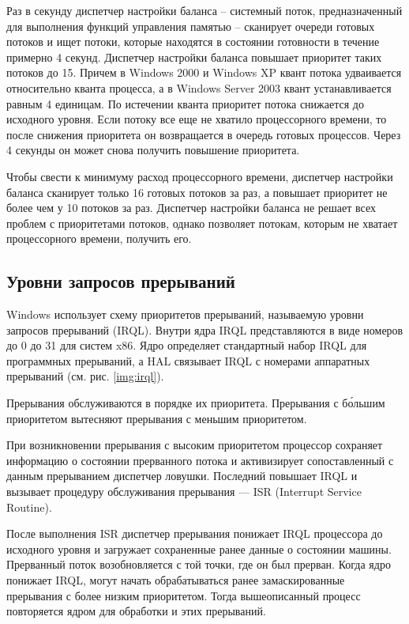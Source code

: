 Раз в секунду диспетчер настройки баланса -- системный поток, предназначенный для выполнения функций управления памятью -- сканирует очереди готовых потоков и ищет потоки, которые находятся в состоянии готовности в течение примерно 4 секунд. Диспетчер настройки баланса повышает приоритет таких потоков до 15. Причем в {\ttfamily Windows 2000} и {\ttfamily Windows XP} квант потока удваивается относительно кванта процесса, а в {\ttfamily Windows Server 2003} квант устанавливается равным 4 единицам. По истечении кванта приоритет потока снижается до исходного уровня. Если потоку все еще не хватило процессорного времени, то после снижения приоритета он возвращается в очередь готовых процессов. Через 4 секунды он может снова получить повышение приоритета.

Чтобы свести к минимуму расход процессорного времени, диспетчер настройки баланса сканирует только 16 готовых потоков за раз, а повышает приоритет не более чем у 10 потоков за раз.
Диспетчер настройки баланса не решает всех проблем с приоритетами потоков, однако позволяет потокам, которым не хватает процессорного времени, получить его.

\subsection{Уровни запросов прерываний}

Windows использует схему приоритетов прерываний, называемую уровни запросов прерываний ({\ttfamily IRQL}). Внутри ядра {\ttfamily IRQL} представляются в виде номеров до 0 до 31 для систем x86. Ядро определяет стандартный набор {\ttfamily IRQL} для программных прерываний, а HAL связывает {\ttfamily IRQL} с номерами аппаратных прерываний (см. рис. \ref{img:irql}).


Прерывания обслуживаются в порядке их приоритета. Прерывания с б\'{о}льшим приоритетом вытесняют прерывания с меньшим приоритетом.

При возникновении прерывания с высоким приоритетом процессор сохраняет информацию о состоянии прерванного потока и активизирует сопоставленный с данным прерыванием диспетчер ловушки. Последний повышает {\ttfamily IRQL} и вызывает процедуру обслуживания прерывания --- {\ttfamily ISR (Interrupt Service Routine)}. 

После выполнения {\ttfamily ISR} диспетчер прерывания понижает {\ttfamily IRQL} процессора до исходного уровня и загружает сохраненные ранее данные о состоянии машины. Прерванный поток возобновляется с той точки, где он был прерван. Когда ядро понижает {\ttfamily IRQL}, могут начать обрабатываться ранее замаскированные прерывания с более низким приоритетом. Тогда вышеописанный процесс повторяется ядром для обработки и этих прерываний.

